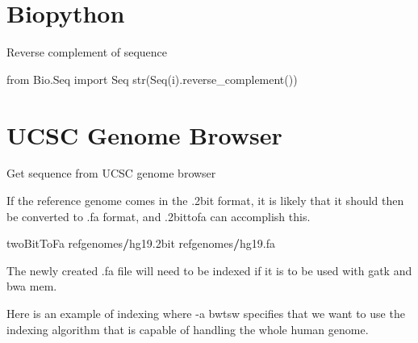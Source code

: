 \documentclass[]{book}
\newenvironment{Shaded}{\begin{snugshade}}{\end{snugshade}}
\newcommand{\SpecialCharTok}[1]{\textcolor[rgb]{0.00,0.00,0.00}{#1}}
\newcommand{\StringTok}[1]{\textcolor[rgb]{0.31,0.60,0.02}{#1}}
\newcommand{\ImportTok}[1]{#1}
\newcommand{\VariableTok}[1]{\textcolor[rgb]{0.00,0.00,0.00}{#1}}
\newcommand{\OperatorTok}[1]{\textcolor[rgb]{0.81,0.36,0.00}{\textbf{#1}}}
\newcommand{\BuiltInTok}[1]{#1}
\newcommand{\NormalTok}[1]{#1}
\begin{document}
\section{Biopython}\label{biopython}

Reverse complement of sequence

\begin{Shaded}
\begin{Highlighting}[]
\ImportTok{from}\NormalTok{ Bio.Seq }\ImportTok{import}\NormalTok{ Seq}
\BuiltInTok{str}\NormalTok{(Seq(i).reverse_complement())}
\end{Highlighting}
\end{Shaded}

\section{UCSC Genome Browser}\label{ucsc-genome-browser}

Get sequence from UCSC genome browser

\begin{Shaded}
\end{Shaded}

If the reference genome comes in the .2bit format, it is likely that it
should then be converted to .fa format, and .2bittofa can accomplish
this.

\begin{Shaded}
\begin{Highlighting}[]
\NormalTok{twoBitToFa refgenomes}\OperatorTok{/}\NormalTok{hg19.2bit refgenomes}\OperatorTok{/}\NormalTok{hg19.fa}
\end{Highlighting}
\end{Shaded}

The newly created .fa file will need to be indexed if it is to be used
with gatk and bwa mem.

Here is an example of indexing where -a bwtsw specifies that we want to
use the indexing algorithm that is capable of handling the whole human
genome.
\end{document}
